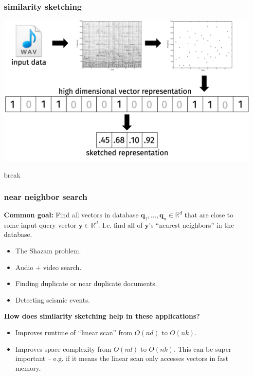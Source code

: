 \documentclass[compress]{beamer}
\newcommand{\bv}[1]{\mathbf{#1}}
\newcommand{\R}{\mathbb{R}}
\begin{document}
\begin{frame}
	\frametitle{similarity sketching}
	\includegraphics[width=\textwidth]{sketch_paradigm.png}
\end{frame}

\begin{frame}[standout]
	\begin{center}
		break
	\end{center}
\end{frame}

\begin{frame}
	\frametitle{near neighbor search}
	\textbf{Common goal:} Find all vectors in database $\bv{q}_1, \ldots, \bv{q}_n \in \R^d$ that are close to some input query vector $\bv{y}\in \R^d$. I.e. find all of $\bv{y}$'s ``nearest neighbors'' in the database.
	\begin{itemize}
		\item The Shazam problem.
		\item Audio + video search.
		\item Finding duplicate or near duplicate documents.
		\item Detecting seismic events.
	\end{itemize}

		\begin{center}
	\textbf{\alert{How does similarity sketching help in these applications?}}
		\end{center}
	\begin{itemize}
		\item Improves runtime of ``linear scan'' from $O(nd)$ to $O(nk)$.
		\item Improves space complexity from $O(nd)$ to $O(nk)$. This can be super important -- e.g. if it means the linear scan only accesses vectors in fast memory.
	\end{itemize}
\end{frame}
\end{document}
